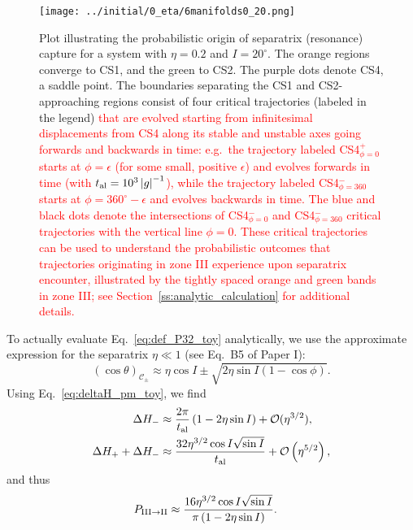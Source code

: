 \documentclass[
        fleqn,
        usenatbib,
        referee
    ]{mnras}
\newcommand*{\abs}[1]{\left|#1\right|}
\newcommand*{\p}[1]{\left(#1\right)}
\newlength{\colummwidth}
\begin{document}
\begin{figure}
    \centering
    \texttt{[image: ../initial/0\_eta/6manifolds0\_20.png]}
    \caption{Plot illustrating the probabilistic origin of separatrix
    (resonance) capture for a system with $\eta = 0.2$ and $I = 20^\circ$. The
    orange regions converge to CS1, and the green to CS2. The purple dots denote
    CS4, a saddle point. The boundaries separating the CS1 and CS2-approaching
    regions consist of four critical trajectories (labeled in the legend)
    \textcolor{red}{that are evolved starting from infinitesimal displacements
    from CS4 along its stable and unstable axes going forwards and backwards in
    time: e.g.\ the trajectory labeled CS4$_{\phi=0}^+$ starts at $\phi =
    \epsilon$ (for some small, positive $\epsilon$) and evolves forwards in time
    (with $t_{\rm al} = 10^3 \abs{g}^{-1}$), while the trajectory labeled
    CS4$_{\phi=360}^-$ starts at $\phi = 360^\circ - \epsilon$ and evolves
    backwards in time. The blue and black dots denote the intersections of
    CS4$_{\phi = 0}^-$ and CS4$_{\phi = 360}^-$ critical trajectories with the
    vertical line $\phi = 0$. These critical trajectories can be used to
    understand the probabilistic outcomes that trajectories originating in zone
    III experience upon separatrix encounter, illustrated by the tightly spaced
    orange and green bands in zone III\@; see
    Section~\ref{ss:analytic_calculation} for additional details.}
    }\label{fig:toy_hop_manifolds}
\end{figure}

To actually evaluate Eq.~\eqref{eq:def_P32_toy} analytically, we use the
approximate expression for the separatrix $\eta \ll 1$ (see Eq.~B5 of Paper I):
\begin{equation}
    \p{\cos \theta}_{\mathcal{C}_{\pm}} \approx
        \eta \cos I \pm \sqrt{2\eta\sin I\p{1 - \cos \phi}}.
        \label{eq:sep_theta}
\end{equation}
Using Eq.~\eqref{eq:deltaH_pm_toy}, we find
\begin{align}
    \Delta H_- &\approx \frac{2\pi}{t_{\rm al}}\p{1
        - 2\eta \sin I} + \mathcal{O}(\eta^{3/2}),\\
    \Delta H_+ + \Delta H_- &\approx
        \frac{32 \eta^{3/2}\cos I \sqrt{\sin I}}{t_{\rm al}}
            + \mathcal{O}\p{\eta^{5/2}},
\end{align}
and thus
\begin{align}
    P_{\rm III \to II} &\approx
        \frac{16 \eta^{3/2} \cos I \sqrt{\sin I}}{\pi
            \p{1  - 2\eta \sin I}}.\label{eq:P32_toy}
\end{align}
\end{document}
